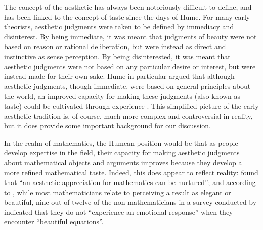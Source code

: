 \documentclass[a4paper,man,natbib]{apa6}
\begin{document}
The concept of the aesthetic has always been notoriously difficult to define, and has been linked to the concept
of taste since the days of Hume. For many early theorists, aesthetic
judgments were taken to be defined by immediacy and disinterest. By being immediate, it was meant that judgments
of beauty were not based on reason or rational deliberation, but were instead as direct and instinctive as
sense perception. By being disinterested, it was meant that aesthetic judgments were not based on any particular
desire or interest, but were instead made for their own sake. Hume in particular argued that although aesthetic
judgments, though immediate, were based on general principles about the world, an improved capacity for making
these judgments (also known as taste) could be cultivated through experience \citep{sep-aesthetic-concept}. 
This simplified picture of the early aesthetic tradition is, of course, much more complex and controversial 
in reality, but it does provide some important background for our discussion.

In the realm of mathematics, the Humean position would be that as people develop expertise in the field, 
their capacity for making aesthetic judgments about mathematical objects and arguments improves 
because they develop a more refined mathematical taste. Indeed, this does appear to reflect reality: 
\cite{dreyfus_aesthetics_1986} found that ``an aesthetic appreciation for mathematics can be nurtured''; and
according to \cite{zeki_experience_2014}, while most mathematicians relate to perceiving a result as elegant or 
beautiful, nine out of twelve of the non-mathematicians in a survey conducted by \cite{zeki_experience_2014}
indicated that they do not ``experience an emotional response'' when they encounter ``beautiful equations''. 
\end{document}
